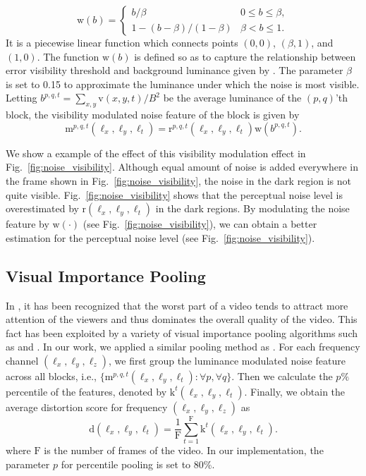 \documentclass{sig-alternate}
\begin{document}
\begin{equation}
\label{eq:brightness}
\mathrm{w}(b) = \begin{cases}
b/\beta & 0\leq b\leq\beta,\\
1-(b-\beta)/(1-\beta) & \beta<b\leq1.
\end{cases}
\end{equation}
It is a piecewise linear function which connects points $(0,0)$, $(\beta,1)$, and $(1,0)$. The function $\mathrm{w}(b)$ is defined so as to capture the relationship between error visibility threshold and background luminance given by \cite{ChoLi1995}. The parameter $\beta$ is set to 0.15 to approximate the luminance under which the noise is most visible. Letting $b^{p,q,t}=\sum_{x,y}{\mathrm{v}(x,y,t)}/B^2$ be the average luminance of the $(p,q)$'th block, the visibility modulated noise feature of the block is given by
\begin{equation}
\label{eq:brightness_feature}
\mathrm{m}^{p,q,t}(\ell_x,\ell_y,\ell_t) = \mathrm{r}^{p,q,t}\left(\ell_x,\ell_y,\ell_t\right)\mathrm{w}\left(b^{p,q,t}\right).
\end{equation}

We show a example of the effect of this visibility modulation effect in Fig.~\ref{fig:noise_visibility}. Although equal amount of noise is added everywhere in the frame shown in Fig.~\ref{fig:noise_visibility}, the noise in the dark region is not quite visible. Fig.~\ref{fig:noise_visibility} shows that the perceptual noise level is overestimated by $\mathrm{r}(\ell_x,\ell_y,\ell_t)$ in the dark regions. By modulating the noise feature by $\mathrm{w}(\cdot)$ (see Fig.~\ref{fig:noise_visibility}), we can obtain a better estimation for the perceptual noise level (see Fig.~\ref{fig:noise_visibility}).


\subsection{Visual Importance Pooling}
In \cite{MooBov2009,ParSesLeeBov2013}, it has been recognized that the worst part of a video tends to attract more attention of the viewers and thus dominates the overall quality of the video. This fact has been exploited by a variety of visual importance pooling algorithms such as \cite{MooBov2009} and \cite{PinWol2004}. In our work, we applied a similar pooling method as \cite{MooBov2009}. For each frequency channel $(\ell_x,\ell_y,\ell_z)$, we first group the luminance modulated noise feature across all blocks, i.e., $\{\mathrm{m}^{p,q,t}(\ell_x,\ell_y,\ell_t): \forall p, \forall q\}$. Then we calculate the $p\%$ percentile of the features, denoted by $\mathrm{k}^{t}(\ell_x,\ell_y,\ell_t)$. Finally, we obtain the average distortion score for frequency $(\ell_x,\ell_y,\ell_z)$ as 
\begin{equation}
\mathrm{d}(\ell_x,\ell_y,\ell_t) = \frac{1}{\mathrm{F}}\sum_{t=1}^\mathrm{F}{\mathrm{k}^{t}(\ell_x,\ell_y,\ell_t)}. 
\end{equation}
where $\mathrm{F}$ is the number of frames of the video. In our implementation, the parameter $p$ for percentile pooling is set to 80\%.
\end{document}
